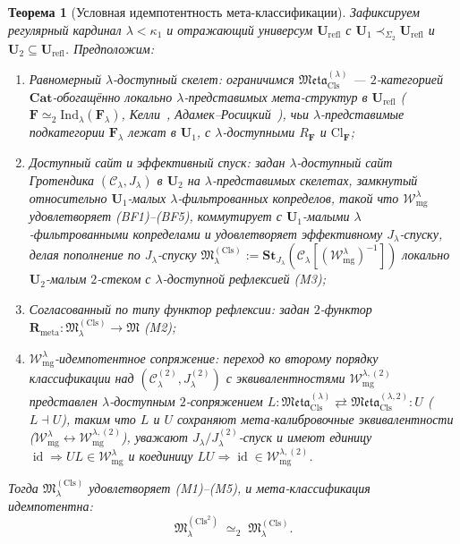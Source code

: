 \documentclass[11pt]{article}
\theoremstyle{plain}
\newtheorem{theorem}{Теорема}[section]
\theoremstyle{definition}
\newcommand{\cC}{\mathcal{C}}
\newcommand{\fM}{\mathfrak{M}}
\newcommand{\Meta}{\mathfrak{Meta}}
\newcommand{\Cl}{\mathrm{Cl}}
\DeclareMathOperator{\id}{id}
\begin{document}
\begin{theorem}[Условная идемпотентность мета-классификации]\label{thm:meta-conditional-idem}
Зафиксируем регулярный кардинал $\lambda < \kappa_1$ и отражающий универсум $\mathbf{U}_{\mathrm{refl}}$ с $\mathbf{U}_1 \prec_{\Sigma_2} \mathbf{U}_{\mathrm{refl}}$ и $\mathbf{U}_2 \subseteq \mathbf{U}_{\mathrm{refl}}$. Предположим:
\begin{enumerate}[nosep,label=\textup{(Idem-\arabic*)}]
\item \emph{Равномерный $\lambda$-доступный скелет}: ограничимся $\Meta_{\mathrm{Cls}}^{(\lambda)}$ — $2$-категорией $\mathbf{Cat}$-обогащённо локально $\lambda$-представимых мета-структур в $\mathbf{U}_{\mathrm{refl}}$ ($\mathbf{F} \simeq_2 \mathrm{Ind}_\lambda(\mathbf{F}_\lambda)$, Келли~\cite{Kelly1982}, Адамек--Росицкий~\cite{AdamekRosicky1994}), чьи $\lambda$-представимые подкатегории $\mathbf{F}_\lambda$ лежат в $\mathbf{U}_1$, с $\lambda$-доступными $R_{\mathbf{F}}$ и $\Cl_{\mathbf{F}}$;
\item \emph{Доступный сайт и эффективный спуск}: задан $\lambda$-доступный сайт Гротендика $(\cC_\lambda, J_\lambda)$ в $\mathbf{U}_2$ на $\lambda$-представимых скелетах, замкнутый относительно $\mathbf{U}_1$-малых $\lambda$-фильтрованных копределов, такой что $\mathcal{W}_{\mathrm{mg}}^\lambda$ удовлетворяет \textup{(BF1)--(BF5)}, коммутирует с $\mathbf{U}_1$-малыми $\lambda$-фильтрованными копределами и удовлетворяет эффективному $J_\lambda$-спуску, делая пополнение по $J_\lambda$-спуску $\fM^{(\mathrm{Cls})}_\lambda := \mathbf{St}_{J_\lambda}(\cC_\lambda[(\mathcal{W}_{\mathrm{mg}}^\lambda)^{-1}])$ локально $\mathbf{U}_2$-малым $2$-стеком с $\lambda$-доступной рефлексией \textup{(M3)};
\item \emph{Согласованный по типу функтор рефлексии}: задан $2$-функтор $\mathbf{R}_{\mathrm{meta}} : \fM^{(\mathrm{Cls})}_\lambda \to \fM$ \textup{(M2)};
\item \emph{$\mathcal{W}_{\mathrm{mg}}^\lambda$-идемпотентное сопряжение}: переход ко второму порядку классификации над $(\cC_\lambda^{(2)}, J_\lambda^{(2)})$ с эквивалентностями $\mathcal{W}_{\mathrm{mg}}^{\lambda,(2)}$ представлен $\lambda$-доступным $2$-сопряжением $L : \Meta_{\mathrm{Cls}}^{(\lambda)} \rightleftarrows \Meta_{\mathrm{Cls}}^{(\lambda, 2)} : U$ ($L \dashv U$), таким что $L$ и $U$ сохраняют мета-калибровочные эквивалентности ($\mathcal{W}_{\mathrm{mg}}^\lambda \leftrightarrow \mathcal{W}_{\mathrm{mg}}^{\lambda,(2)}$), уважают $J_\lambda / J_\lambda^{(2)}$-спуск и имеют единицу $\id \Rightarrow U L \in \mathcal{W}_{\mathrm{mg}}^\lambda$ и коединицу $L U \Rightarrow \id \in \mathcal{W}_{\mathrm{mg}}^{\lambda,(2)}$.
\end{enumerate}
Тогда $\fM^{(\mathrm{Cls})}_\lambda$ удовлетворяет \textup{(M1)--(M5)}, и мета-классификация идемпотентна:
\[
  \fM^{(\mathrm{Cls}^2)}_\lambda \;\simeq_2\; \fM^{(\mathrm{Cls})}_\lambda.
\]
\end{theorem}
\end{document}
